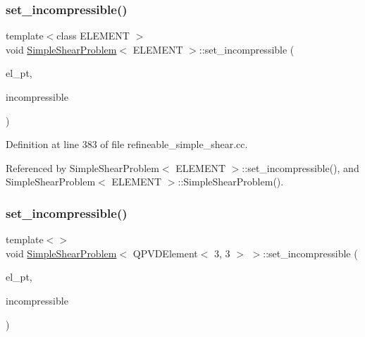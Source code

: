 \mbox{\label{classSimpleShearProblem_a3e5d5f57fc041531ee683f50395536f0}} 
\subsubsection{\texorpdfstring{set\+\_\+incompressible()}{set\_incompressible()}\hspace{0.1cm}{\footnotesize\ttfamily [2/7]}}
{\footnotesize\ttfamily template$<$class E\+L\+E\+M\+E\+NT $>$ \\
void \hyperlink{classSimpleShearProblem}{Simple\+Shear\+Problem}$<$ E\+L\+E\+M\+E\+NT $>$\+::set\+\_\+incompressible (\begin{DoxyParamCaption}\item[{E\+L\+E\+M\+E\+NT $\ast$}]{el\+\_\+pt,  }\item[{const bool \&}]{incompressible }\end{DoxyParamCaption})\hspace{0.3cm}{\ttfamily [private]}}



Definition at line 383 of file refineable\+\_\+simple\+\_\+shear.\+cc.



Referenced by Simple\+Shear\+Problem$<$ E\+L\+E\+M\+E\+N\+T $>$\+::set\+\_\+incompressible(), and Simple\+Shear\+Problem$<$ E\+L\+E\+M\+E\+N\+T $>$\+::\+Simple\+Shear\+Problem().

\mbox{\label{classSimpleShearProblem_af8ac5eb5a799de066ec2128905cd4ef6}} 
\subsubsection{\texorpdfstring{set\+\_\+incompressible()}{set\_incompressible()}\hspace{0.1cm}{\footnotesize\ttfamily [3/7]}}
{\footnotesize\ttfamily template$<$$>$ \\
void \hyperlink{classSimpleShearProblem}{Simple\+Shear\+Problem}$<$ Q\+P\+V\+D\+Element$<$ 3, 3 $>$ $>$\+::set\+\_\+incompressible (\begin{DoxyParamCaption}\item[{Q\+P\+V\+D\+Element$<$ 3, 3 $>$ $\ast$}]{el\+\_\+pt,  }\item[{const bool \&}]{incompressible }\end{DoxyParamCaption})\hspace{0.3cm}{\ttfamily [private]}}



